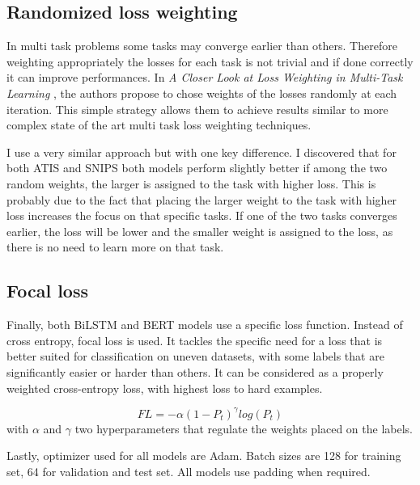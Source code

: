 \documentclass[a4paper]{article}
\begin{document}
\subsection{Randomized loss weighting}

In multi task problems some tasks may converge earlier than others. Therefore weighting appropriately the losses for each task is not trivial and if done correctly it can improve performances. In \emph{A Closer Look at Loss Weighting in Multi-Task Learning} \cite{lin2022a}, the authors propose to chose weights of the losses randomly at each iteration. This simple strategy allows them to achieve results similar to more complex state of the art multi task loss weighting techniques. 

I use a very similar approach but with one key difference. I discovered that for both ATIS and SNIPS both models perform slightly better if among the two random weights, the larger is assigned to the task with higher loss. This is probably due to the fact that placing the larger weight to the task with higher loss increases the focus on that specific tasks. If one of the two tasks converges earlier, the loss will be lower and the smaller weight is assigned to the loss, as there is no need to learn more on that task. 

\subsection{Focal loss}
Finally, both BiLSTM and BERT models use a specific loss function. Instead of cross entropy, focal loss is used. It tackles the specific need for a loss that is better suited for classification on uneven datasets, with some labels that are significantly easier or harder than others. It can be considered as a properly weighted cross-entropy loss, with highest loss to hard examples.

\begin{equation}
 FL = -\alpha(1-P_t)^\gamma log(P_t)
\end{equation}
with $\alpha$ and $\gamma$ two hyperparameters that regulate the weights placed on the labels.  

Lastly, optimizer used for all models are Adam. Batch sizes are 128 for training set, 64 for validation and test set. All models use padding when required.

% 
\end{document}
